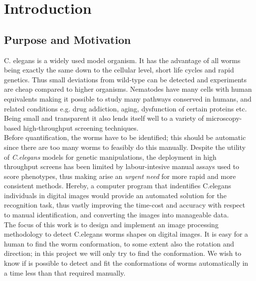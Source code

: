 \cleardoublepage
\thispagestyle{empty}
\chapter{Introduction}

\section{Purpose and Motivation}
\label{sec:motivation}


C. elegans is a widely used model organism. It has the advantage of all worms 
being exactly the same down to the cellular level, short life cycles and rapid
 genetics. Thus small deviations from wild-type can be detected and experiments
 are cheap compared to higher organisms. Nematodes have many cells with human
 equivalents making it possible to study many pathways conserved in humans, 
and related conditions e.g. drug addiction, aging, dysfunction of certain
 proteins etc. Being small and transparent it also lends itself well to a 
variety of microscopy-based high-throughput screening techniques.\\
 
Before quantification, the worms have to be identified; this should be 
automatic since there are too many worms to feasibly do this manually.
Despite the utility of \emph{C.elegans} models for genetic 
manipulations, the deployment in high throughput screens has been limited by 
labour-intesive manual assays used to score phenotypes, thus making arise
an \emph{urgent need} for more rapid and more consistent methods.
Hereby, a computer
program that indentifies C.elegans individuals in digital images would 
provide an automated solution for the recognition task, thus vastly 
improving the time-cost and accuracy with respect to manual identification, 
and converting the images into manageable data.\\

The focus of this work is to design and implement an image processing
methodology to detect C.elegans worms shapes on digital images.
It is easy for a human to find the worm conformation,
to some extent also the rotation and direction; in this project we will only 
try to find the conformation. We wish to know if is possible to detect and fit
the conformations of worms automatically in a time less than that required manually.\\

